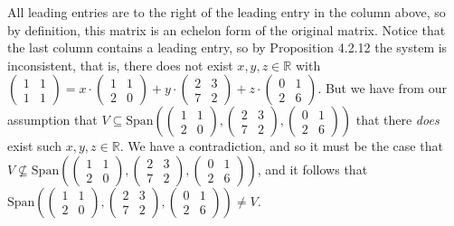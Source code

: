\documentclass[12pt]{article}
\newenvironment{problem}[2][Problem]
{
	\begin{trivlist} 
		\item[\hskip \labelsep {\bfseries #1 #2:}]
	}
{
	\end{trivlist}
	}
\begin{document}
\begin{problem}{6}
All leading entries are to the right of the leading entry in the column above, so by definition, this matrix is an echelon form of the original matrix. Notice that the last column contains a leading entry, so by Proposition 4.2.12 the system is inconsistent, that is, there does not exist $x,y,z \in \mathbb{R}$ with $\begin{pmatrix}1&1\\1&1\end{pmatrix} = x\cdot \begin{pmatrix}1&1\\2&0\end{pmatrix}+ y\cdot \begin{pmatrix}2&3\\7&2\end{pmatrix} + z\cdot\begin{pmatrix}0&1\\2&6\end{pmatrix}$. But we have from our assumption that $V\subseteq \text{Span}\left( \begin{pmatrix}1&1\\2&0\end{pmatrix}, \begin{pmatrix}2&3\\7&2\end{pmatrix}, \begin{pmatrix}0&1\\2&6\end{pmatrix} \right)$ that there {\it does} exist such $x,y,z \in \mathbb{R}$. We have a contradiction, and so it must be the case that $V\nsubseteq \text{Span}\left( \begin{pmatrix}1&1\\2&0\end{pmatrix}, \begin{pmatrix}2&3\\7&2\end{pmatrix}, \begin{pmatrix}0&1\\2&6\end{pmatrix} \right)$, and it follows that $\text{Span}\left( \begin{pmatrix}1&1\\2&0\end{pmatrix}, \begin{pmatrix}2&3\\7&2\end{pmatrix}, \begin{pmatrix}0&1\\2&6\end{pmatrix} \right) \neq V$.

\end{problem}
\end{document}
